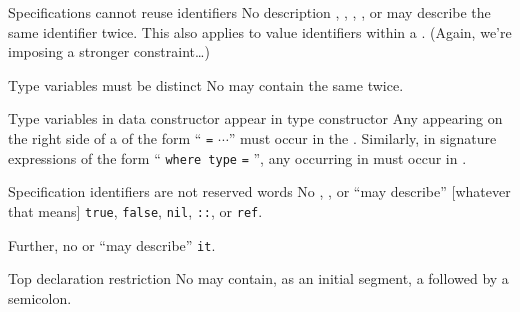 \begin{clause}{Specifications cannot reuse identifiers}
No description , ,
, , or 
may describe the same identifier twice. This also applies to value
identifiers within a . (Again, we're imposing a
stronger constraint\dots)
\end{clause}

\begin{clause}{Type variables must be distinct}
No  may contain the same  twice.
\end{clause}

\begin{clause}{Type variables in data constructor appear in type constructor}
Any  appearing on the right side of a
 of the form ``
 \texttt{=} $\cdots$'' must occur in the
. Similarly, in signature expressions of the form
`` \texttt{where type} 
 \texttt{=} '', any
 occurring in  must occur in . 
\end{clause}

\begin{clause}{Specification identifiers are not reserved words}
No , , or 
``may describe'' [whatever that means] \texttt{true}, \texttt{false},
\texttt{nil}, \texttt{::}, or \texttt{ref}.

Further, no  or  ``may describe''
\texttt{it}. 
\end{clause}

\begin{comment}{Constraining our deviation}
So our deviation~\zref{deviation:no-redefinitions} from the ``full''
language imposed the constraint that redefinitions are illegal, but we
can ``shadow'' an identifier if it is inside a structure. We see
that the Definition further limits the possible identifiers we can
shadow \emph{in general}.
\end{comment}

\begin{clause}{Top declaration restriction}
No  may contain, as an initial segment, a
 followed by a semicolon.
\end{clause}

